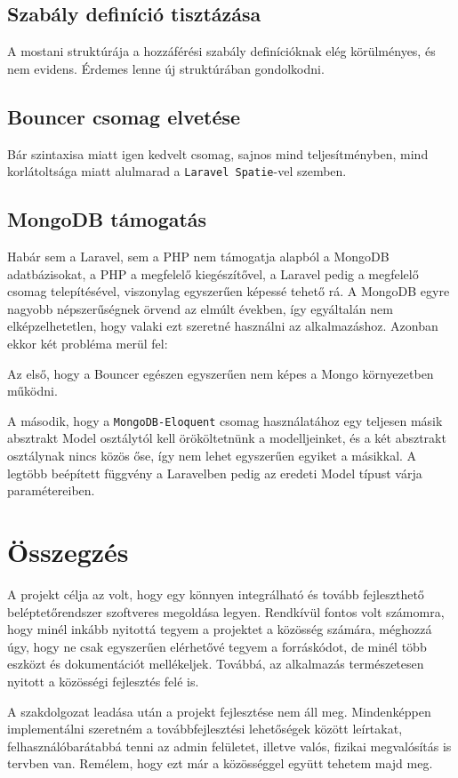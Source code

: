 \documentclass[a4paper,12pt]{thesis-ekf}
\theoremstyle{definition}
\begin{document}
		\section*{Szabály definíció tisztázása}
			A mostani struktúrája a hozzáférési szabály definícióknak elég körülményes, és nem evidens. Érdemes lenne új struktúrában gondolkodni.
			
		\section*{Bouncer csomag elvetése}
			Bár szintaxisa miatt igen kedvelt csomag, sajnos mind teljesítményben, mind korlátoltsága miatt alulmarad a \texttt{Laravel Spatie}-vel szemben. 
			
		\section*{MongoDB támogatás}
			Habár sem a Laravel, sem a PHP nem támogatja alapból a MongoDB adatbázisokat, a PHP a megfelelő kiegészítővel, a Laravel pedig a megfelelő csomag telepítésével, viszonylag egyszerűen képessé tehető rá. A MongoDB egyre nagyobb népszerűségnek örvend az elmúlt években, így egyáltalán nem elképzelhetetlen, hogy valaki ezt szeretné használni az alkalmazáshoz. Azonban ekkor két probléma merül fel:
			
			Az első, hogy a Bouncer egészen egyszerűen nem képes a Mongo környezetben működni.
			
			A második, hogy a \texttt{MongoDB-Eloquent} csomag használatához egy teljesen másik absztrakt Model osztálytól kell örököltetnünk a modelljeinket, és a két absztrakt osztálynak nincs közös őse, így nem lehet egyszerűen  egyiket a másikkal. A legtöbb beépített függvény a Laravelben pedig az eredeti Model típust várja paramétereiben.
			
	\chapter*{Összegzés}
    	A projekt célja az volt, hogy egy könnyen integrálható és tovább fejleszthető beléptetőrendszer szoftveres megoldása legyen. Rendkívül fontos volt számomra, hogy minél inkább nyitottá tegyem a projektet a közösség számára, méghozzá úgy, hogy ne csak egyszerűen elérhetővé tegyem a forráskódot, de minél több eszközt és dokumentációt mellékeljek.
    	Továbbá, az alkalmazás természetesen nyitott a közösségi fejlesztés felé is.
    	
    	A szakdolgozat leadása után a projekt fejlesztése nem áll meg. Mindenképpen implementálni szeretném a továbbfejlesztési lehetőségek között leírtakat, felhasználóbarátabbá tenni az admin felületet, illetve valós, fizikai megvalósítás is tervben van. Remélem, hogy ezt már a közösséggel együtt tehetem majd meg.
    	
\end{document}

